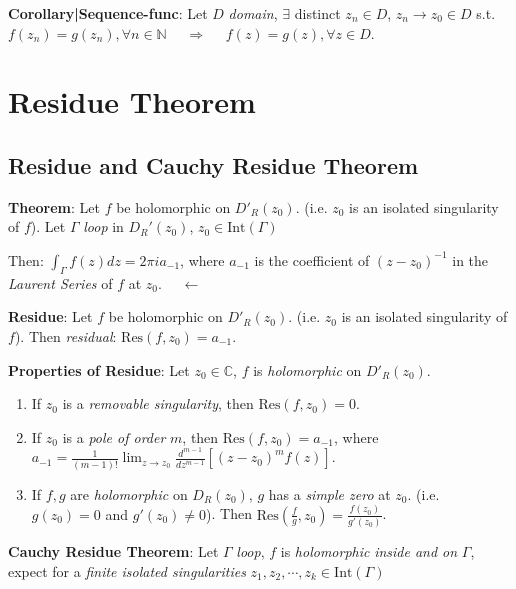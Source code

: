 \documentclass[9pt]{article}
\begin{document}
\quad\textbf{Corollary|Sequence-func}: Let $D$ \textit{domain}, $\exists$ distinct $z_n\in D$, $z_n\to z_0\in D$ s.t. $f(z_n)=g(z_n),\forall n\in\mathbb{N}$ \ \ $\Rightarrow$ \ \ $f(z)=g(z),\forall z\in D$.


\section{Residue Theorem} %

\subsection{Residue and Cauchy Residue Theorem} %

\textbf{Theorem}: Let $f$ be holomorphic on $D'_{R}(z_0)$. {\scriptsize (i.e. $z_0$ is an isolated singularity of $f$)}. Let $\Gamma$ \textit{loop} in $D_{R}'(z_0)$, $z_0\in\text{Int}(\Gamma)$

\qquad\qquad\quad Then: $\int_{\Gamma}f(z)dz=2\pi i a_{-1}$, {\footnotesize where $a_{-1}$ is the coefficient of $(z-z_0)^{-1}$ in the \textit{Laurent Series} of $f$ at $z_0$.} \qquad \qquad \qquad \ \ $\leftarrow$

\textbf{Residue}: Let $f$ be holomorphic on $D'_{R}(z_0)$. {\scriptsize (i.e. $z_0$ is an isolated singularity of $f$)}. Then \textit{residual}: $\text{Res}(f,z_0)=a_{-1}$. 

\textbf{Properties of Residue}: Let $z_0\in\mathbb{C}$, $f$ is \textit{holomorphic} on $D'_{R}(z_0)$.

\begin{enumerate}[itemsep=-2pt, topsep=-2pt]
    \item If $z_0$ is a \textit{removable singularity}, then $\text{Res}(f,z_0)=0$.
    \item If $z_0$ is a \textit{pole of order} $m$, then $\text{Res}(f,z_0)=a_{-1}$, where $a_{-1}=\frac{1}{(m-1)!}\lim_{z\to z_0}\frac{d^{m-1}}{dz^{m-1}}\left[(z-z_0)^mf(z)\right]$.
    \item If $f,g$ are \textit{holomorphic} on $D_{R}(z_0)$, $g$ has a \textit{simple zero} at $z_0$. {\scriptsize (i.e. $g(z_0)=0$ and $g'(z_0)\ne 0$)}. Then $\text{Res}\left(\frac{f}{g},z_0\right)=\frac{f(z_0)}{g'(z_0)}$.
\end{enumerate}

\newpage

\textbf{Cauchy Residue Theorem}: Let $\Gamma$ \textit{loop}, $f$ is \textit{holomorphic} \textit{inside and on} $\Gamma$, expect for a \textit{finite isolated singularities} $z_1,z_2,\cdots,z_k\in\text{Int}(\Gamma)$
\end{document}
